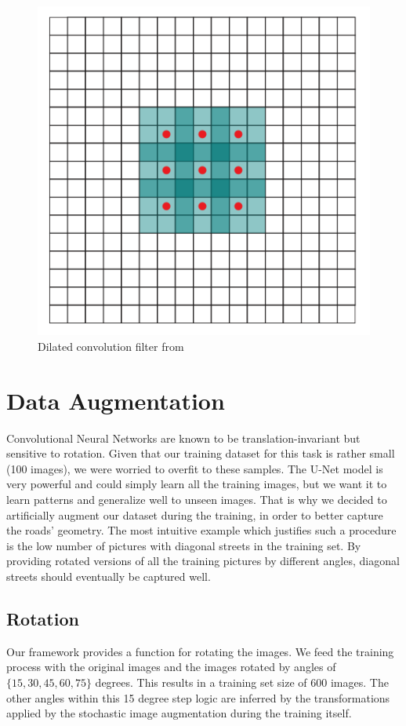 \documentclass[10pt,conference,compsocconf]{IEEEtran}
\begin{document}
\begin{figure}
  \center%
  \includegraphics[width=0.5\columnwidth]{figures/dilated.png}
  \caption{Dilated convolution filter from~\cite{ferenc-dilated}}\label{fig:dilated}
\end{figure}


\section{Data Augmentation}\label{sec:augmentation}
Convolutional Neural Networks are known to be translation-invariant but sensitive to rotation. Given that our training dataset for this task is rather small (100 images), we were worried to overfit to these samples. The U-Net model is very powerful and could simply learn all the training images, but we want it to learn patterns and generalize well to unseen images. That is why we decided to artificially augment our dataset during the training, in order to better capture the roads' geometry.
The most intuitive example which justifies such a procedure is the low number of pictures with diagonal streets in the training set. By providing rotated versions of all the training pictures by different angles,  diagonal streets should eventually be captured well.

\subsection{Rotation}\label{sec:rotation}
Our framework provides a function for rotating the images. We feed the training process with the original images and the images rotated by angles of $\{15, 30, 45, 60, 75\}$ degrees. This results in a training set size of 600 images. The other angles within this 15 degree step logic are inferred by the transformations applied by the stochastic image augmentation during the training itself.
\end{document}
